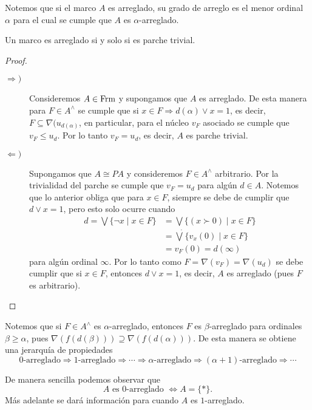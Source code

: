 Notemos que si el marco $A$ es arreglado, su grado de arreglo es el menor ordinal $\alpha$ para el cual se cumple que $A$ es $\alpha$-arreglado.

\begin{lem}\label{Lema8.2.2}
    Un marco es arreglado si y solo si es parche trivial.
\end{lem}

\begin{proof}
    \begin{description}
        \item[$\Rightarrow )$] Consideremos $A\in \mathrm{Frm}$ y supongamos que $A$ es arreglado. De esta manera para $F\in A^\wedge$ se cumple que si $x\in F\Rightarrow d(\alpha)\vee x=1$, es decir, $F\subseteq \nabla(u_{d(\alpha)}$, en particular, para el núcleo $v_F$ asociado se cumple que $v_F\leq u_d$. Por lo tanto $v_F=u_d$, es decir, $A$ es parche trivial.

        \item[$\Leftarrow )$] Supongamos que $A\cong PA$ y consideremos $F\in A^\wedge$ arbitrario. Por la trivialidad del parche se cumple que $v_F=u_d$ para algún $d\in A$. Notemos que lo anterior obliga que para $x\in F$, siempre se debe de cumplir que $d\vee x=1$, pero esto solo ocurre cuando 
        \[
        \begin{split}
        d=\bigvee \{\neg x\mid x\in F\}&=\bigvee\{(x\succ 0)\mid x\in F\}\\
        &=\dot{\bigvee}\{v_x(0)\mid x\in F\}\\
        &=v_F(0)=d(\infty)
        \end{split}
        \]
        para algún ordinal $\infty$. Por lo tanto como $F=\nabla(v_F)=\nabla(u_d)$ se debe cumplir que si $x\in F$, entonces $d\vee x=1$, es decir, $A$ es arreglado (pues $F$ es arbitrario). 
    \end{description}
\end{proof}

Notemos que si $F\in A^\wedge$ es $\alpha$-arreglado, entonces $F$ es $\beta$-arreglado para ordinales $\beta\geq \alpha$, pues $\nabla(f(d(\beta)))\supseteq \nabla(f(d(\alpha)))$. De esta manera se obtiene una jerarquía de propiedades
\[
0\mbox{-arreglado}\Rightarrow 1\mbox{-arreglado}\Rightarrow \cdots \Rightarrow \alpha\mbox{-arreglado}\Rightarrow (\alpha+1)\mbox{-arreglado}\Rightarrow \cdots 
\]

De manera sencilla podemos observar que
\[
A \mbox{ es } 0\mbox{-arreglado }\Leftrightarrow A=\{*\}.
\]
Más adelante se dará información para cuando $A$ es $1$-arreglado.\\

